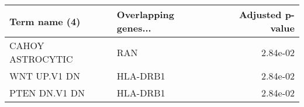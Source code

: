 \begin{tabular}{llr}
\toprule
   Term name (4) & Overlapping genes... &  Adjusted p-value \\
\midrule
CAHOY ASTROCYTIC &                  RAN &          2.84e-02 \\
    WNT UP.V1 DN &             HLA-DRB1 &          2.84e-02 \\
   PTEN DN.V1 DN &             HLA-DRB1 &          2.84e-02 \\
\bottomrule
\end{tabular}
